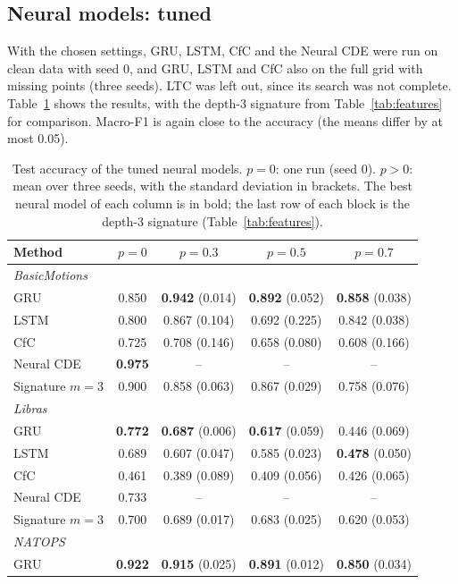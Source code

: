 \subsection{Neural models: tuned}

With the chosen settings, GRU, LSTM, CfC and the Neural CDE were run on
clean data with seed 0, and GRU, LSTM and CfC also on the full grid with
missing points (three seeds). LTC was left out, since its search was not
complete. Table~\ref{tab:tuned} shows the results, with the depth-3
signature from Table~\ref{tab:features} for comparison. Macro-F1 is again
close to the accuracy (the means differ by at most 0.05).

\begin{table}[ht]
\centering
\small
\caption{Test accuracy of the tuned neural models. $p = 0$: one run
(seed 0). $p > 0$: mean over three seeds, with the standard deviation in
brackets. The best neural model of each column is in bold; the last row of
each block is the depth-3 signature (Table~\ref{tab:features}).}
\label{tab:tuned}
\begin{tabular}{lcccc}
\toprule
Method & $p = 0$ & $p = 0.3$ & $p = 0.5$ & $p = 0.7$ \\
\midrule
\multicolumn{5}{l}{\emph{BasicMotions}} \\
GRU & 0.850 & \textbf{0.942} (0.014) & \textbf{0.892} (0.052) & \textbf{0.858} (0.038) \\
LSTM & 0.800 & 0.867 (0.104) & 0.692 (0.225) & 0.842 (0.038) \\
CfC & 0.725 & 0.708 (0.146) & 0.658 (0.080) & 0.608 (0.166) \\
Neural CDE & \textbf{0.975} & -- & -- & -- \\
Signature $m=3$ & 0.900 & 0.858 (0.063) & 0.867 (0.029) & 0.758 (0.076) \\
\midrule
\multicolumn{5}{l}{\emph{Libras}} \\
GRU & \textbf{0.772} & \textbf{0.687} (0.006) & \textbf{0.617} (0.059) & 0.446 (0.069) \\
LSTM & 0.689 & 0.607 (0.047) & 0.585 (0.023) & \textbf{0.478} (0.050) \\
CfC & 0.461 & 0.389 (0.089) & 0.409 (0.056) & 0.426 (0.065) \\
Neural CDE & 0.733 & -- & -- & -- \\
Signature $m=3$ & 0.700 & 0.689 (0.017) & 0.683 (0.025) & 0.620 (0.053) \\
\midrule
\multicolumn{5}{l}{\emph{NATOPS}} \\
GRU & \textbf{0.922} & \textbf{0.915} (0.025) & \textbf{0.891} (0.012) & \textbf{0.850} (0.034) \\

\end{tabular}
\end{table}
